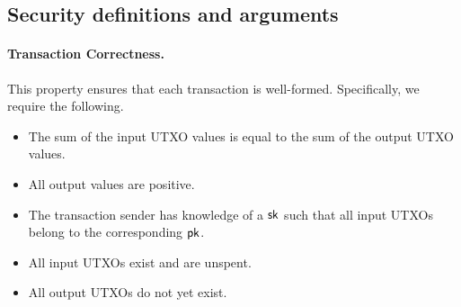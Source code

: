 


\subsection{Security definitions and arguments}

\paragraph{Transaction Correctness.} This property ensures that each transaction is well-formed. Specifically, we require the following.
\begin{itemize}
  \item The sum of the input UTXO values is equal to the sum of the output UTXO values.
  \item All output values are positive.
  \item The transaction sender has knowledge of a $\mathsf{sk}$ such that all input UTXOs belong to the corresponding $\mathsf{pk}$.
  \item All input UTXOs exist and are unspent.
  \item All output UTXOs do not yet exist.
\end{itemize}


